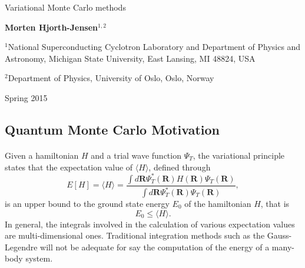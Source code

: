 \documentclass[%
twoside,                 %
final,                   %
10pt]{article}
\begin{document}




\thispagestyle{empty}

\begin{center}
{\LARGE\bf
\begin{spacing}{1.25}
Variational Monte Carlo methods
\end{spacing}
}
\end{center}


\begin{center}
{\bf Morten Hjorth-Jensen${}^{1, 2}$} \\ [0mm]
\end{center}

    \begin{center}
\centerline{{\small ${}^1$National Superconducting Cyclotron Laboratory and Department of Physics and Astronomy, Michigan State University, East Lansing, MI 48824, USA}}
\centerline{{\small ${}^2$Department of Physics, University of Oslo, Oslo, Norway}}
\end{center}
    

\begin{center} %
Spring 2015
\end{center}

\vspace{1cm}


\subsection*{Quantum Monte Carlo Motivation}

\paragraph{}
Given a hamiltonian $H$ and a trial wave function $\Psi_T$, the variational principle states that the expectation value of $\langle H \rangle$, defined through 
\[
   E[H]= \langle H \rangle =
   \frac{\int d\bm{R}\Psi^{\ast}_T(\bm{R})H(\bm{R})\Psi_T(\bm{R})}
        {\int d\bm{R}\Psi^{\ast}_T(\bm{R})\Psi_T(\bm{R})},
\]
is an upper bound to the ground state energy $E_0$ of the hamiltonian $H$, that is 
\[
    E_0 \le \langle H \rangle .
\]
In general, the integrals involved in the calculation of various  expectation values  are multi-dimensional ones. Traditional integration methods such as the Gauss-Legendre will not be adequate for say the  computation of the energy of a many-body system.
\end{document}
